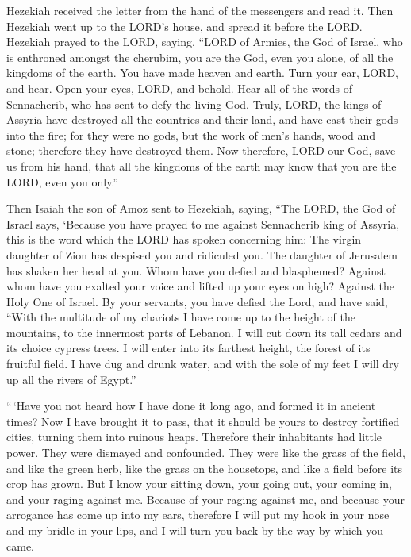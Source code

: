  Hezekiah received the letter from the hand of the
messengers and read it. Then Hezekiah went up to the LORD's house, and
spread it before the LORD.  Hezekiah prayed to the LORD,
saying,  ``LORD of Armies, the God of Israel, who is
enthroned amongst the cherubim, you are the God, even you alone, of all
the kingdoms of the earth. You have made heaven and earth. 
Turn your ear, LORD, and hear. Open your eyes, LORD, and behold. Hear
all of the words of Sennacherib, who has sent to defy the living God.
 Truly, LORD, the kings of Assyria have destroyed all the
countries and their land,  and have cast their gods into
the fire; for they were no gods, but the work of men's hands, wood and
stone; therefore they have destroyed them.  Now therefore,
LORD our God, save us from his hand, that all the kingdoms of the earth
may know that you are the LORD, even you only.''

 Then Isaiah the son of Amoz sent to Hezekiah, saying,
``The LORD, the God of Israel says, `Because you have prayed to me
against Sennacherib king of Assyria,  this is the word
which the LORD has spoken concerning him: The virgin daughter of Zion
has despised you and ridiculed you. The daughter of Jerusalem has shaken
her head at you.  Whom have you defied and blasphemed?
Against whom have you exalted your voice and lifted up your eyes on
high? Against the Holy One of Israel.  By your servants,
you have defied the Lord, and have said, ``With the multitude of my
chariots I have come up to the height of the mountains, to the innermost
parts of Lebanon. I will cut down its tall cedars and its choice cypress
trees. I will enter into its farthest height, the forest of its fruitful
field.  I have dug and drunk water, and with the sole of my
feet I will dry up all the rivers of Egypt.''

 ``\,`Have you not heard how I have done it long ago, and
formed it in ancient times? Now I have brought it to pass, that it
should be yours to destroy fortified cities, turning them into ruinous
heaps.  Therefore their inhabitants had little power. They
were dismayed and confounded. They were like the grass of the field, and
like the green herb, like the grass on the housetops, and like a field
before its crop has grown.  But I know your sitting down,
your going out, your coming in, and your raging against me.
 Because of your raging against me, and because your
arrogance has come up into my ears, therefore I will put my hook in your
nose and my bridle in your lips, and I will turn you back by the way by
which you came.

